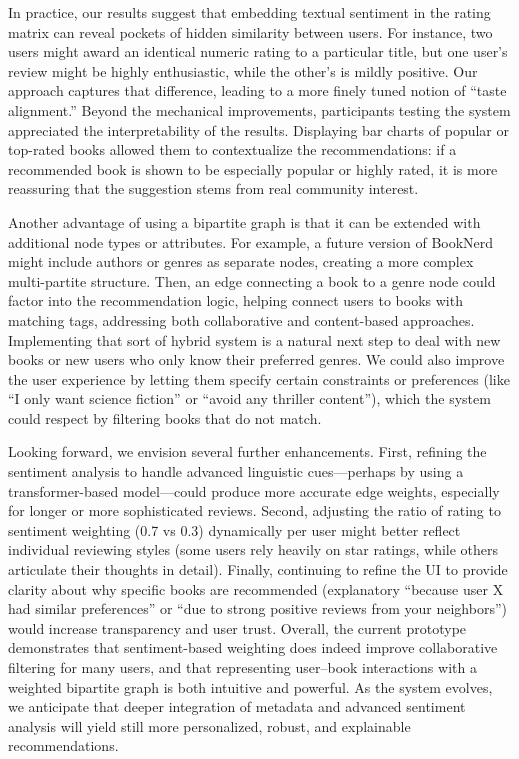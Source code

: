 \documentclass[12pt]{article}
\begin{document}
In practice, our results suggest that embedding textual sentiment in the rating matrix can reveal pockets of hidden similarity between users. For instance, two users might award an identical numeric rating to a particular title, but one user’s review might be highly enthusiastic, while the other’s is mildly positive. Our approach captures that difference, leading to a more finely tuned notion of “taste alignment.” Beyond the mechanical improvements, participants testing the system appreciated the interpretability of the results. Displaying bar charts of popular or top-rated books allowed them to contextualize the recommendations: if a recommended book is shown to be especially popular or highly rated, it is more reassuring that the suggestion stems from real community interest.

Another advantage of using a bipartite graph is that it can be extended with additional node types or attributes. For example, a future version of BookNerd might include authors or genres as separate nodes, creating a more complex multi-partite structure. Then, an edge connecting a book to a genre node could factor into the recommendation logic, helping connect users to books with matching tags, addressing both collaborative and content-based approaches. Implementing that sort of hybrid system is a natural next step to deal with new books or new users who only know their preferred genres. We could also improve the user experience by letting them specify certain constraints or preferences (like “I only want science fiction” or “avoid any thriller content”), which the system could respect by filtering books that do not match.

Looking forward, we envision several further enhancements. First, refining the sentiment analysis to handle advanced linguistic cues—perhaps by using a transformer-based model—could produce more accurate edge weights, especially for longer or more sophisticated reviews. Second, adjusting the ratio of rating to sentiment weighting (0.7 vs 0.3) dynamically per user might better reflect individual reviewing styles (some users rely heavily on star ratings, while others articulate their thoughts in detail). Finally, continuing to refine the UI to provide clarity about why specific books are recommended (explanatory “because user X had similar preferences” or “due to strong positive reviews from your neighbors”) would increase transparency and user trust. Overall, the current prototype demonstrates that sentiment-based weighting does indeed improve collaborative filtering for many users, and that representing user--book interactions with a weighted bipartite graph is both intuitive and powerful. As the system evolves, we anticipate that deeper integration of metadata and advanced sentiment analysis will yield still more personalized, robust, and explainable recommendations.
\end{document}

